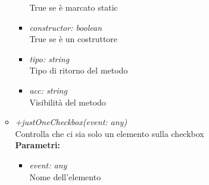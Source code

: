 \begin{itemize}
\begin{itemize}
\begin{itemize}
    			True se è marcato static
    			\item \emph{constructor: boolean}\\
    			True se è un costruttore
    			\item \emph{tipo: string}\\
    			Tipo di ritorno del metodo
    			\item \emph{acc: string}\\
    			Visibilità del metodo
    		\end{itemize}
    		\item \emph{+justOneCheckbox(event: any)}\\
    		Controlla che ci sia solo un elemento sulla checkbox\\
    		\textbf{Parametri:}
    		\begin{itemize}
    			\item \emph{event: any}\\
    			Nome dell'elemento
    		\end{itemize}
		\end{itemize}
\end{itemize}